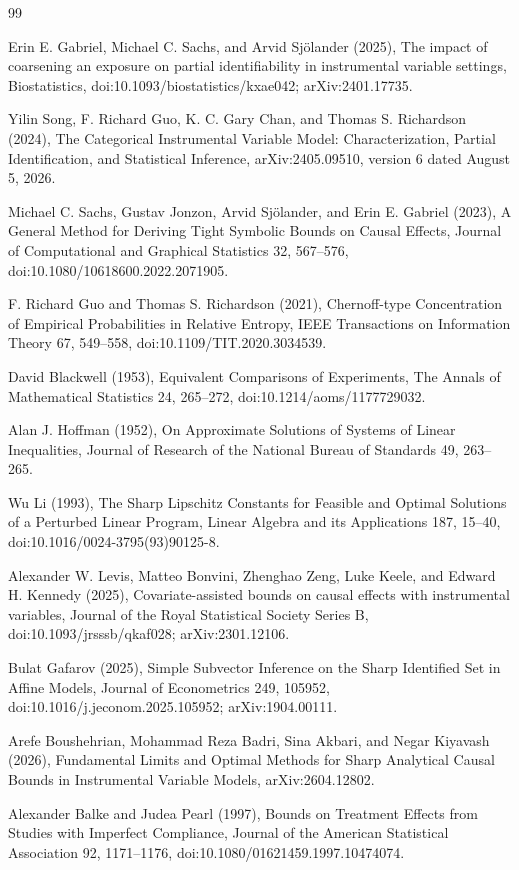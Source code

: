\documentclass{article}
\begin{document}
\begin{thebibliography}{99}

   Erin E. Gabriel, Michael C. Sachs, and Arvid Sjölander (2025), The impact of coarsening an exposure on partial identifiability in instrumental variable settings, Biostatistics, doi:10.1093/biostatistics/kxae042; arXiv:2401.17735.

   Yilin Song, F. Richard Guo, K. C. Gary Chan, and Thomas S. Richardson (2024), The Categorical Instrumental Variable Model: Characterization, Partial Identification, and Statistical Inference, arXiv:2405.09510, version 6 dated August 5, 2026.

   Michael C. Sachs, Gustav Jonzon, Arvid Sjölander, and Erin E. Gabriel (2023), A General Method for Deriving Tight Symbolic Bounds on Causal Effects, Journal of Computational and Graphical Statistics 32, 567--576, doi:10.1080/10618600.2022.2071905.

   F. Richard Guo and Thomas S. Richardson (2021), Chernoff-type Concentration of Empirical Probabilities in Relative Entropy, IEEE Transactions on Information Theory 67, 549--558, doi:10.1109/TIT.2020.3034539.

   David Blackwell (1953), Equivalent Comparisons of Experiments, The Annals of Mathematical Statistics 24, 265--272, doi:10.1214/aoms/1177729032.

   Alan J. Hoffman (1952), On Approximate Solutions of Systems of Linear Inequalities, Journal of Research of the National Bureau of Standards 49, 263--265.

   Wu Li (1993), The Sharp Lipschitz Constants for Feasible and Optimal Solutions of a Perturbed Linear Program, Linear Algebra and its Applications 187, 15--40, doi:10.1016/0024-3795(93)90125-8.

   Alexander W. Levis, Matteo Bonvini, Zhenghao Zeng, Luke Keele, and Edward H. Kennedy (2025), Covariate-assisted bounds on causal effects with instrumental variables, Journal of the Royal Statistical Society Series B, doi:10.1093/jrsssb/qkaf028; arXiv:2301.12106.

   Bulat Gafarov (2025), Simple Subvector Inference on the Sharp Identified Set in Affine Models, Journal of Econometrics 249, 105952, doi:10.1016/j.jeconom.2025.105952; arXiv:1904.00111.

   Arefe Boushehrian, Mohammad Reza Badri, Sina Akbari, and Negar Kiyavash (2026), Fundamental Limits and Optimal Methods for Sharp Analytical Causal Bounds in Instrumental Variable Models, arXiv:2604.12802.

   Alexander Balke and Judea Pearl (1997), Bounds on Treatment Effects from Studies with Imperfect Compliance, Journal of the American Statistical Association 92, 1171--1176, doi:10.1080/01621459.1997.10474074.

\end{thebibliography}
\end{document}
